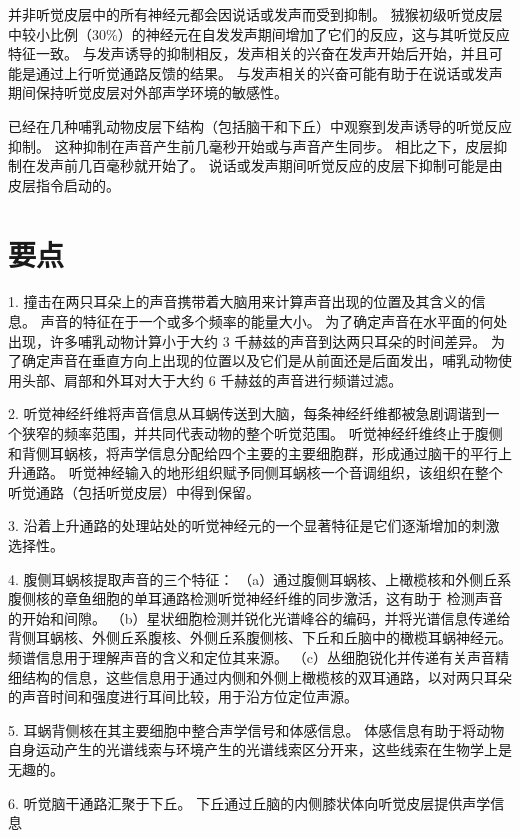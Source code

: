 并非听觉皮层中的所有神经元都会因说话或发声而受到抑制。
狨猴初级听觉皮层中较小比例（30\%）的神经元在自发发声期间增加了它们的反应，这与其听觉反应特征一致。
与发声诱导的抑制相反，发声相关的兴奋在发声开始后开始，并且可能是通过上行听觉通路反馈的结果。
与发声相关的兴奋可能有助于在说话或发声期间保持听觉皮层对外部声学环境的敏感性。


已经在几种哺乳动物皮层下结构（包括脑干和下丘）中观察到发声诱导的听觉反应抑制。
这种抑制在声音产生前几毫秒开始或与声音产生同步。
相比之下，皮层抑制在发声前几百毫秒就开始了。
说话或发声期间听觉反应的皮层下抑制可能是由皮层指令启动的。



\section{要点}

1. 撞击在两只耳朵上的声音携带着大脑用来计算声音出现的位置及其含义的信息。
声音的特征在于一个或多个频率的能量大小。
为了确定声音在水平面的何处出现，许多哺乳动物计算小于大约 3 千赫兹的声音到达两只耳朵的时间差异。
为了确定声音在垂直方向上出现的位置以及它们是从前面还是后面发出，哺乳动物使用头部、肩部和外耳对大于大约 6 千赫兹的声音进行频谱过滤。 


2. 听觉神经纤维将声音信息从耳蜗传送到大脑，每条神经纤维都被急剧调谐到一个狭窄的频率范围，并共同代表动物的整个听觉范围。
听觉神经纤维终止于腹侧和背侧耳蜗核，将声学信息分配给四个主要的主要细胞群，形成通过脑干的平行上升通路。
听觉神经输入的地形组织赋予同侧耳蜗核一个音调组织，该组织在整个听觉通路（包括听觉皮层）中得到保留。


3. 沿着上升通路的处理站处的听觉神经元的一个显著特征是它们逐渐增加的刺激选择性。


4. 腹侧耳蜗核提取声音的三个特征：
（a）通过腹侧耳蜗核、上橄榄核和外侧丘系腹侧核的章鱼细胞的单耳通路检测听觉神经纤维的同步激活，这有助于 检测声音的开始和间隙。
（b）星状细胞检测并锐化光谱峰谷的编码，并将光谱信息传递给背侧耳蜗核、外侧丘系腹核、外侧丘系腹侧核、下丘和丘脑中的橄榄耳蜗神经元。 
频谱信息用于理解声音的含义和定位其来源。 
（c）丛细胞锐化并传递有关声音精细结构的信息，这些信息用于通过内侧和外侧上橄榄核的双耳通路，以对两只耳朵的声音时间和强度进行耳间比较，用于沿方位定位声源。


5. 耳蜗背侧核在其主要细胞中整合声学信号和体感信息。
体感信息有助于将动物自身运动产生的光谱线索与环境产生的光谱线索区分开来，这些线索在生物学上是无趣的。


6. 听觉脑干通路汇聚于下丘。
下丘通过丘脑的内侧膝状体向听觉皮层提供声学信息

